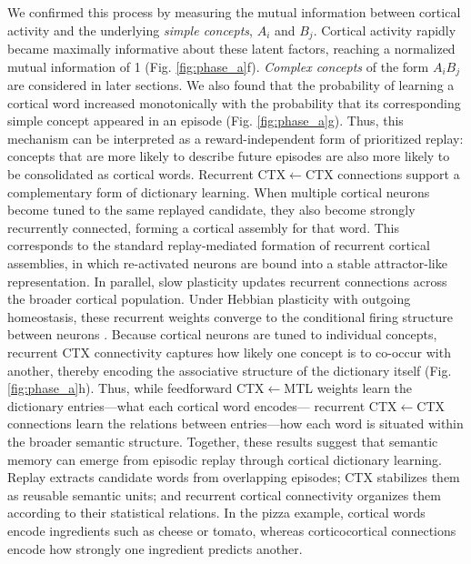 \documentclass{article}
\begin{document}
\newline\newline
We confirmed this process by measuring the mutual information between cortical activity and the underlying \textit{simple concepts}, $A_i$ and $B_j$. Cortical activity rapidly became maximally informative about these latent factors, reaching a normalized mutual information of 1 (Fig. \ref{fig:phase_a}f). \textit{Complex concepts} of the form $A_iB_j$ are considered in later sections. We also found that the probability of learning a cortical word increased monotonically with the probability that its corresponding simple concept appeared in an episode (Fig. \ref{fig:phase_a}g). Thus, this mechanism can be interpreted as a reward-independent form of prioritized replay: concepts that are more likely to describe future episodes are also more likely to be consolidated as cortical words.
\newline\newline
Recurrent CTX$\leftarrow$CTX connections support a complementary form of dictionary learning. When multiple cortical neurons become tuned to the same replayed candidate, they also become strongly recurrently connected, forming a cortical assembly for that word. This corresponds to the standard replay-mediated formation of recurrent cortical assemblies, in which re-activated neurons are bound into a stable attractor-like representation. In parallel, slow plasticity updates recurrent connections across the broader cortical population. Under Hebbian plasticity with outgoing homeostasis, these recurrent weights converge to the conditional firing structure between neurons \cite{albesagonzalez_2025}. Because cortical neurons are tuned to individual concepts, recurrent CTX connectivity captures how likely one concept is to co-occur with another, thereby encoding the associative structure of the dictionary itself (Fig. \ref{fig:phase_a}h). Thus, while feedforward CTX$\leftarrow$MTL weights learn the dictionary entries---what each cortical word encodes--- recurrent CTX$\leftarrow$CTX connections learn the relations between entries---how each word is situated within the broader semantic structure.
\newline\newline
Together, these results suggest that semantic memory can emerge from episodic replay through cortical dictionary learning. Replay extracts candidate words from overlapping episodes; CTX stabilizes them as reusable semantic units; and recurrent cortical connectivity organizes them according to their statistical relations. In the pizza example, cortical words encode ingredients such as cheese or tomato, whereas corticocortical connections encode how strongly one ingredient predicts another.
\end{document}
